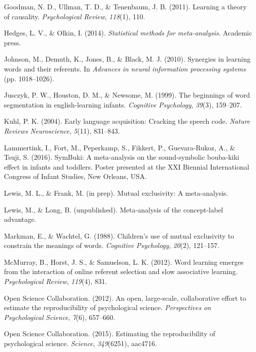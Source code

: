 \documentclass[english,floatsintext,man]{apa6}
\theoremstyle{definition}
\theoremstyle{definition}
\theoremstyle{remark}
\begin{document}
\hypertarget{ref-goodman2011learning}{}
Goodman, N. D., Ullman, T. D., \& Tenenbaum, J. B. (2011). Learning a
theory of causality. \emph{Psychological Review}, \emph{118}(1), 110.

\hypertarget{ref-hedges2014statistical}{}
Hedges, L. V., \& Olkin, I. (2014). \emph{Statistical methods for
meta-analysis}. Academic press.

\hypertarget{ref-johnson2010synergies}{}
Johnson, M., Demuth, K., Jones, B., \& Black, M. J. (2010). Synergies in
learning words and their referents. In \emph{Advances in neural
information processing systems} (pp. 1018--1026).

\hypertarget{ref-jusczyk1999beginnings}{}
Jusczyk, P. W., Houston, D. M., \& Newsome, M. (1999). The beginnings of
word segmentation in english-learning infants. \emph{Cognitive
Psychology}, \emph{39}(3), 159--207.

\hypertarget{ref-kuhl2004early}{}
Kuhl, P. K. (2004). Early language acquisition: Cracking the speech
code. \emph{Nature Reviews Neuroscience}, \emph{5}(11), 831--843.

\hypertarget{ref-lammertink2016}{}
Lammertink, I., Fort, M., Peperkamp, S., Fikkert, P., Guevara-Rukoz, A.,
\& Tsuji, S. (2016). SymBuki: A meta-analysis on the sound-symbolic
bouba-kiki effect in infants and toddlers. Poster presented at the XXI
Biennial International Congress of Infant Studies, New Orleans, USA.

\hypertarget{ref-lfprep}{}
Lewis, M. L., \& Frank, M. (in prep). Mutual exclusivity: A
meta-analysis.

\hypertarget{ref-lewisunpublished}{}
Lewis, M., \& Long, B. (unpublished). Meta-analysis of the concept-label
advantage.

\hypertarget{ref-markman1988}{}
Markman, E., \& Wachtel, G. (1988). Children's use of mutual exclusivity
to constrain the meanings of words. \emph{Cognitive Psychology},
\emph{20}(2), 121--157.

\hypertarget{ref-mcmurray2012word}{}
McMurray, B., Horst, J. S., \& Samuelson, L. K. (2012). Word learning
emerges from the interaction of online referent selection and slow
associative learning. \emph{Psychological Review}, \emph{119}(4), 831.

\hypertarget{ref-open2012open}{}
Open Science Collaboration. (2012). An open, large-scale, collaborative
effort to estimate the reproducibility of psychological science.
\emph{Perspectives on Psychological Science}, \emph{7}(6), 657--660.

\hypertarget{ref-open2015estimating}{}
Open Science Collaboration. (2015). Estimating the reproducibility of
psychological science. \emph{Science}, \emph{349}(6251), aac4716.
\end{document}
